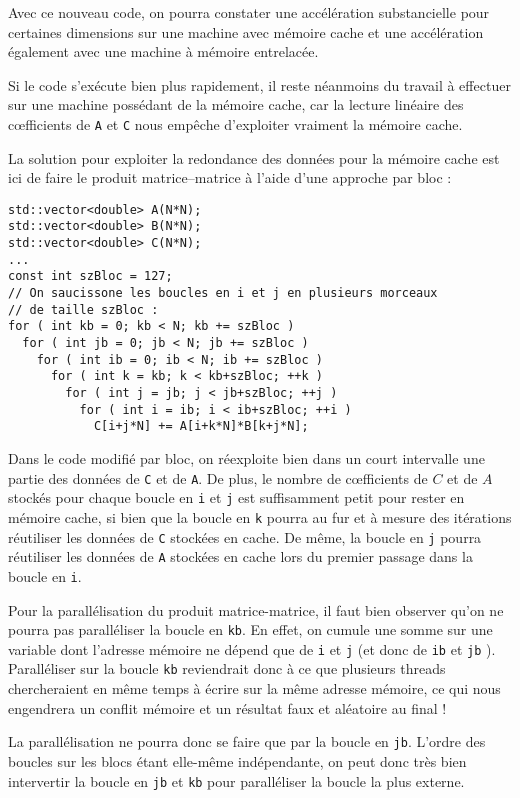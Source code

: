 \documentclass[fleqn,11pt]{article}
\begin{document}
Avec ce nouveau code, on pourra constater une accélération substancielle pour certaines dimensions sur une machine avec mémoire cache et une accélération également avec une machine à mémoire entrelacée.

Si le code s'exécute bien plus rapidement, il reste néanmoins du travail à effectuer sur une machine possédant de la mémoire cache, car la lecture linéaire des c{\oe}fficients de \texttt{A} et \texttt{C} nous empêche d'exploiter vraiment la mémoire cache.

La solution pour exploiter la redondance des données pour la mémoire cache est ici de faire le produit matrice--matrice à l'aide d'une approche par bloc :

\begin{lstlisting}
std::vector<double> A(N*N);
std::vector<double> B(N*N);
std::vector<double> C(N*N);
...
const int szBloc = 127;
// On saucissone les boucles en i et j en plusieurs morceaux 
// de taille szBloc :
for ( int kb = 0; kb < N; kb += szBloc )
  for ( int jb = 0; jb < N; jb += szBloc )
    for ( int ib = 0; ib < N; ib += szBloc )
      for ( int k = kb; k < kb+szBloc; ++k )
        for ( int j = jb; j < jb+szBloc; ++j )
          for ( int i = ib; i < ib+szBloc; ++i )
            C[i+j*N] += A[i+k*N]*B[k+j*N];
\end{lstlisting}

Dans le code modifié par bloc, on réexploite bien dans un court intervalle une partie des données
de \texttt{C} et de \texttt{A}. De plus, le nombre de c{\oe}fficients de $C$ et de $A$ stockés pour chaque
boucle en \texttt{i} et \texttt{j} est suffisamment petit pour rester en mémoire cache, si bien que la boucle
en \texttt{k} pourra au fur et à mesure des itérations réutiliser les données de \texttt{C} stockées en cache.
De même, la boucle en \texttt{j} pourra réutiliser les données de \texttt{A} stockées en cache lors du premier passage dans la boucle en \texttt{i}.

Pour la parallélisation du produit matrice-matrice, il faut bien observer qu'on ne pourra pas paralléliser
la boucle en \texttt{kb}. En effet, on cumule une somme sur une variable dont l'adresse mémoire ne dépend
que de \texttt{i} et \texttt{j} (et donc de \texttt{ib} et \texttt{jb} ). Paralléliser sur la boucle 
\texttt{kb} reviendrait donc à ce que plusieurs threads chercheraient en même temps à écrire sur la
même adresse mémoire, ce qui nous engendrera un conflit mémoire et un résultat faux et aléatoire au final !

La parallélisation ne pourra donc se faire que par la boucle en \texttt{jb}. L'ordre des boucles sur les blocs étant elle-même indépendante, on peut donc très bien intervertir la boucle en \texttt{jb} et \texttt{kb} pour paralléliser la boucle la plus externe.
\end{document}
